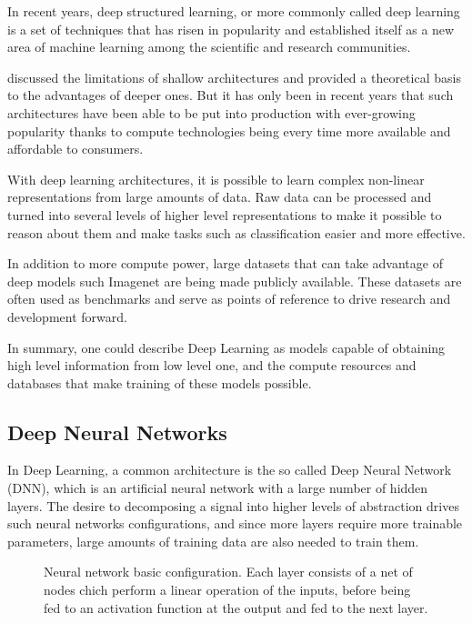 In recent years, deep structured learning, or more commonly called deep learning is a set of techniques that has risen in popularity and established itself as a new area of machine learning among the scientific and research communities. \cite{deng2014deep}

\cite{bengio2009learning} discussed the limitations of shallow architectures and provided a theoretical basis to the advantages of deeper ones. But it has only been in recent years that such architectures have been able to be put into production with ever-growing popularity thanks to compute technologies being every time more available and affordable to consumers.

With deep learning architectures, it is possible to learn complex non-linear representations from large amounts of data. Raw data can be processed and turned into several levels of higher level representations to make it possible to reason about them and make tasks such as classification easier and more effective.

In addition to more compute power, large datasets that can take advantage of deep models such Imagenet \cite{russakovsky2015imagenet} are being made publicly available. These datasets are often used as benchmarks and serve as points of reference to drive research and development forward.

In summary, one could describe Deep Learning as models capable of obtaining high level information from low level one, and the compute resources and databases that make training of these models possible.

\subsection{Deep Neural Networks}

In Deep Learning, a common architecture is the so called Deep Neural Network (DNN), which is an artificial neural network with a large number of hidden layers. The desire to decomposing a signal into higher levels of abstraction drives such neural networks configurations, and since more layers require more trainable parameters, large amounts of training data are also needed to train them.

\begin{figure}[h]
    \centering
    

    \caption{Neural network basic configuration. Each layer consists of a net of nodes chich perform a linear operation of the inputs, before being fed to an activation function at the output and fed to the next layer.}
    \label{fig:neural-net}
\end{figure}

